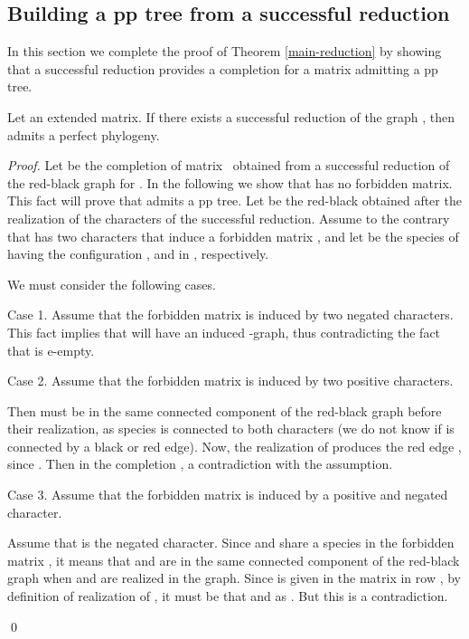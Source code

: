 \documentclass{llncs}
\newcommand{\me}{{} }
\begin{document}
\subsection{Building a pp tree from a successful reduction}

In this section we complete the proof of Theorem \ref{main-reduction}  by showing that  a successful reduction provides a completion for a matrix  admitting a pp tree.


\begin{theorem}
Let  an extended matrix. If there exists a successful reduction of the graph , then  admits a perfect phylogeny.
\end{theorem}


\begin{proof}

Let    be the completion of matrix \me\ obtained from a successful reduction of the red-black graph for .  
In the following we show that  has no forbidden matrix. This fact will prove that  admits a pp tree.
Let  be the red-black obtained after the realization of the characters of the successful reduction.
 Assume to the contrary that  has two characters  that induce a forbidden matrix , and let  be the species of   having the configuration ,  and  in , respectively.
 
We must consider the following cases.

Case 1. Assume that the forbidden matrix is induced by   two negated characters.
This fact implies that  will have an induced -graph, thus contradicting the fact that  is e-empty.

Case 2. Assume that the forbidden matrix is induced by two positive characters.

 Then   must be in the same connected component of the  red-black graph before their realization, as species   is connected to both characters (we do not know if  is connected  by a black or red edge).
 Now, the realization of  produces the red edge ,  since . Then  in the completion  , a contradiction with the assumption.
 
 Case 3. Assume that the forbidden matrix is induced by a positive and negated character.

Assume that  is the negated character.  Since  and  share a species in the forbidden matrix , it means that  and  are in the same connected component of the red-black graph  when   and  are realized in the graph. Since  is given in the matrix  in row , by definition of realization of , it must be that   and  as . But this  is a contradiction.




\qed
\end{proof}
\end{document}
